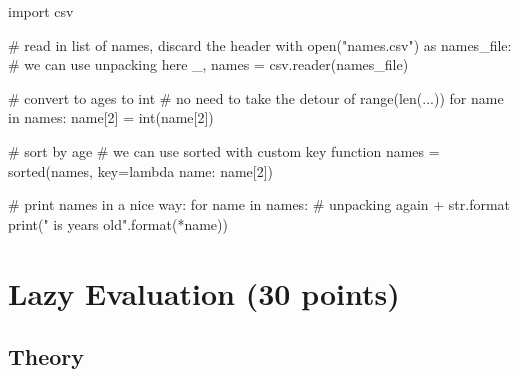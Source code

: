 \begin{solution}
    \begin{pythoncode}
import csv

# read in list of names, discard the header
with open("names.csv") as names_file:
    # we can use unpacking here
    _, names = csv.reader(names_file)

# convert to ages to int
# no need to take the detour of range(len(...))
for name in names:
    name[2] = int(name[2])

# sort by age
# we can use sorted with custom key function
names = sorted(names, key=lambda name: name[2])

# print names in a nice way:
for name in names:
    # unpacking again + str.format
    print("{} {} is {} years old".format(*name))
    \end{pythoncode}
\end{solution}


\section{Lazy Evaluation (30 points)}

\subsection{Theory}

